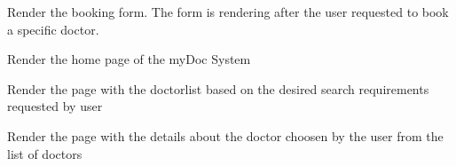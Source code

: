 \documentclass[letterpaper,10pt,english]{sphinxmanual}
\begin{document}

\begin{fulllineitems}
\label{views:doctors.views.booking_form}
Render the booking form. The form is rendering after the user requested to book a specific doctor.

\end{fulllineitems}


\begin{fulllineitems}
\label{views:doctors.views.home}
Render the home page of the myDoc System

\end{fulllineitems}


\begin{fulllineitems}
\label{views:doctors.views.search}
Render the page with the doctorlist based on the desired search requirements requested by user

\end{fulllineitems}


\begin{fulllineitems}
\label{views:doctors.views.showDoctorDetails}
Render the page with the details about the doctor choosen by the user from the list of doctors

\end{fulllineitems}


\renewcommand{\indexname}{Index}
\printindex
\end{document}
